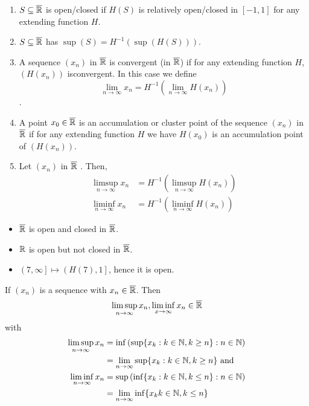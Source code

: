 \begin{definition}
\begin{enumerate}
	\item \(S \subseteq \overline{\mathbb{R}}\) is open/closed if \(H\left( S \right) \) is relatively open/closed in \(\left[ -1, 1 \right] \) for any extending function \(H\).
	\item \(S \subseteq \overline{\mathbb{R}}\) has \(\sup \left( S \right)  = H^{-1}\left(\sup\left( H\left( S \right)  \right) \right)\).
	\item A sequence \(\left( x_{n} \right) \) in \(\overline{\mathbb{R}}\) is convergent (in \(\overline{\mathbb{R}}\)) if for any extending function \(H\), \(\left( H\left( x_{n} \right)  \right) \) isconvergent. In this case we define \[\lim_{n \to \infty}x_{n} = H^{-1} \left( \lim_{n \to \infty} H \left( x_{n} \right)  \right) \].
	\item A point \(x_0 \in \overline{\mathbb{R}}\) is an accumulation or cluster point of the sequence \(\left( x_{n} \right) \) in \(\overline{\mathbb{R}}\) if for any extending function \(H\) we have \(H\left( x_0 \right) \) is an accumulation point of \(\left( H\left( x_{n} \right)  \right) \).
	\item Let \(\left( x_{n} \right) \) in \(\overline{\mathbb{R}}\) . Then, \begin{align*}
			\limsup_{n \to \infty}x_{n} &= H^{-1}\left( \limsup_{n \to \infty}H\left( x_{n} \right)  \right) \\
			\liminf_{n \to \infty}x_{n} &= H^{-1}\left( \liminf_{n \to \infty}H\left( x_{n} \right)  \right)
		\end{align*}
\end{enumerate}
\end{definition}
\begin{example}
	\begin{itemize}
\item	\(\overline{\mathbb{R}}\) is open and closed in \(\overline{\mathbb{R}}\).
	\item \(\mathbb{R}\) is open but not closed in \(\overline{\mathbb{R}}\).
	\item \(\left( 7, \infty \right] \mapsto \left( H\left( 7 \right) , 1 \right]  \), hence it is open.
	\end{itemize}

\end{example}
\begin{proposition}
	If \(\left( x_{n} \right) \) is a sequence with \(x_{n} \in \overline{\mathbb{R}}\). Then \[\limsup_{n \to \infty}x_{n}, \liminf_{x \to \infty} x_{n} \in \overline{\mathbb{R}}\] with
	\begin{align*}
		\limsup_{n \to \infty}x_{n} &= \inf \left( \sup \{x_{k} : k \in \N, k \ge n\} : n \in \N  \right)\\
		&= \lim_{n \to \infty} \sup \{x_{k} : k\in \N, k\ge n\} \text{ and} \\
		\liminf_{n \to \infty}x_{n} &=  \sup \left( \inf \{x_{k} : k \in \N, k\le n\} : n \in\N  \right)  \\
		&= \lim_{n \to \infty} \inf \{x_{k} k\in \N , k \le n\}  \\
	\end{align*}
\end{proposition}

